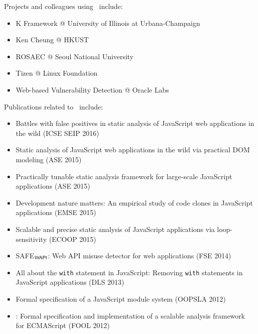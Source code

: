 Projects and colleagues using \safe\ include:
\begin{itemize}
\item K Framework @ University of Illinois at Urbana-Champaign
\item Ken Cheung @ HKUST
\item ROSAEC @ Seoul National University
\item Tizen @ Linux Foundation
\item Web-based Vulnerability Detection @ Oracle Labs
\end{itemize}
Publications related to \safe\ include:
\begin{itemize}
\item Battles with false positives in static analysis of JavaScript web applications in the wild (ICSE SEIP 2016)
\item Static analysis of JavaScript web applications in the wild via practical DOM modeling (ASE 2015)
\item Practically tunable static analysis framework for large-scale JavaScript applications (ASE 2015)
\item Development nature matters: An empirical study of code clones in JavaScript applications (EMSE 2015)
\item Scalable and precise static analysis of JavaScript applications via loop-sensitivity (ECOOP 2015)
\item {\sf SAFE$_{\mbox{\sf\scriptsize WAPI}}$}: Web API misuse detector for web applications (FSE 2014)
\item All about the \texttt{with} statement in JavaScript: Removing \texttt{with} statements in JavaScript applications (DLS 2013)
\item Formal specification of a JavaScript module system (OOPSLA 2012)
\item \safe: Formal specification and implementation of a scalable analysis framework for ECMAScript (FOOL 2012)
\end{itemize}
